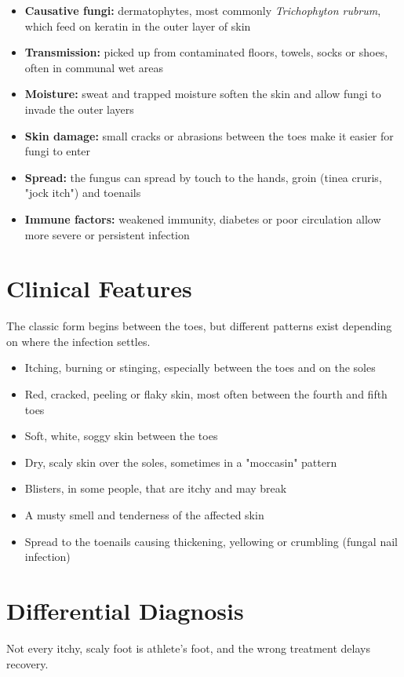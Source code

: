 \begin{itemize}
    \item \textbf{Causative fungi:} dermatophytes, most commonly \textit{Trichophyton rubrum}, which feed on keratin in the outer layer of skin
    \item \textbf{Transmission:} picked up from contaminated floors, towels, socks or shoes, often in communal wet areas
    \item \textbf{Moisture:} sweat and trapped moisture soften the skin and allow fungi to invade the outer layers
    \item \textbf{Skin damage:} small cracks or abrasions between the toes make it easier for fungi to enter
    \item \textbf{Spread:} the fungus can spread by touch to the hands, groin (tinea cruris, "jock itch") and toenails
    \item \textbf{Immune factors:} weakened immunity, diabetes or poor circulation allow more severe or persistent infection
\end{itemize}

\section*{Clinical Features}
The classic form begins between the toes, but different patterns exist depending on where the infection settles.

\begin{itemize}
    \item Itching, burning or stinging, especially between the toes and on the soles
    \item Red, cracked, peeling or flaky skin, most often between the fourth and fifth toes
    \item Soft, white, soggy skin between the toes
    \item Dry, scaly skin over the soles, sometimes in a "moccasin" pattern
    \item Blisters, in some people, that are itchy and may break
    \item A musty smell and tenderness of the affected skin
    \item Spread to the toenails causing thickening, yellowing or crumbling (fungal nail infection)
\end{itemize}

\section*{Differential Diagnosis}
Not every itchy, scaly foot is athlete's foot, and the wrong treatment delays recovery.

